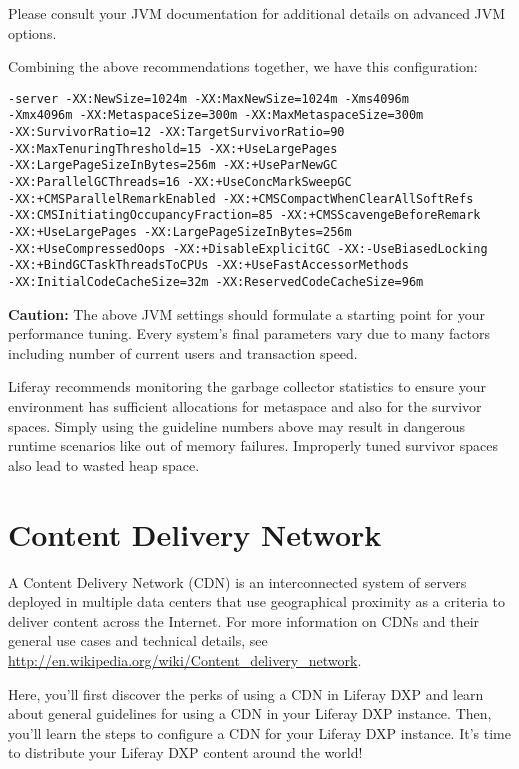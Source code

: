 Please consult your JVM documentation for additional details on advanced
JVM options.

Combining the above recommendations together, we have this
configuration:

\begin{verbatim}
-server -XX:NewSize=1024m -XX:MaxNewSize=1024m -Xms4096m
-Xmx4096m -XX:MetaspaceSize=300m -XX:MaxMetaspaceSize=300m
-XX:SurvivorRatio=12 -XX:TargetSurvivorRatio=90
-XX:MaxTenuringThreshold=15 -XX:+UseLargePages 
-XX:LargePageSizeInBytes=256m -XX:+UseParNewGC 
-XX:ParallelGCThreads=16 -XX:+UseConcMarkSweepGC 
-XX:+CMSParallelRemarkEnabled -XX:+CMSCompactWhenClearAllSoftRefs
-XX:CMSInitiatingOccupancyFraction=85 -XX:+CMSScavengeBeforeRemark 
-XX:+UseLargePages -XX:LargePageSizeInBytes=256m
-XX:+UseCompressedOops -XX:+DisableExplicitGC -XX:-UseBiasedLocking
-XX:+BindGCTaskThreadsToCPUs -XX:+UseFastAccessorMethods
-XX:InitialCodeCacheSize=32m -XX:ReservedCodeCacheSize=96m
\end{verbatim}

\noindent\hrulefill

\textbf{Caution:} The above JVM settings should formulate a starting
point for your performance tuning. Every system's final parameters vary
due to many factors including number of current users and transaction
speed.

\noindent\hrulefill

Liferay recommends monitoring the garbage collector statistics to ensure
your environment has sufficient allocations for metaspace and also for
the survivor spaces. Simply using the guideline numbers above may result
in dangerous runtime scenarios like out of memory failures. Improperly
tuned survivor spaces also lead to wasted heap space.

\section{Content Delivery Network}\label{content-delivery-network}

A Content Delivery Network (CDN) is an interconnected system of servers
deployed in multiple data centers that use geographical proximity as a
criteria to deliver content across the Internet. For more information on
CDNs and their general use cases and technical details, see
\url{http://en.wikipedia.org/wiki/Content_delivery_network}.

Here, you'll first discover the perks of using a CDN in Liferay DXP and
learn about general guidelines for using a CDN in your Liferay DXP
instance. Then, you'll learn the steps to configure a CDN for your
Liferay DXP instance. It's time to distribute your Liferay DXP content
around the world!

